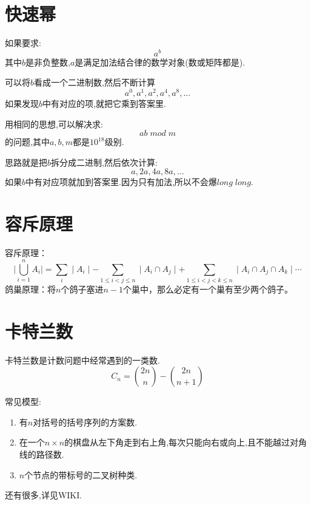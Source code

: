 \documentclass{beamer}
\begin{document}
	\section{快速幂}
		\begin{frame}
			如果要求:
			$$
				a^b 
			$$
			其中$b$是非负整数,$a$是满足加法结合律的数学对象(数或矩阵都是).
			
			\pause 
			
			可以将$b$看成一个二进制数,然后不断计算
			$$
				a^0, a^1, a^2,a^4,a^8,...
			$$
			如果发现$b$中有对应的项,就把它乘到答案里.
		\end{frame}
		\begin{frame}
			用相同的思想,可以解决求:
			$$
				ab \; mod \; m
			$$
			的问题,其中$a, b, m$都是$10^{18}$级别.
			
			\pause
			
			思路就是把$b$拆分成二进制,然后依次计算:
			$$
			a,2a,4a,8a,...
			$$
			如果$b$中有对应项就加到答案里.因为只有加法,所以不会爆$long\;long$.
		\end{frame}
	\section{容斥原理}
		\begin{frame}
			容斥原理：
			$$
			\mid \bigcup_{i = 1}^{n} A_i\mid = \sum_{i} \mid  A_i \mid - \sum_{1 \leq i < j \leq n} \mid A_i \cap A_j \mid + \sum_{1 \leq i < j < k \leq n} \mid A_i \cap A_j \cap A_k \mid \cdots 
			$$
			鸽巢原理：将$n$个鸽子塞进$n-1$个巢中，那么必定有一个巢有至少两个鸽子。
		\end{frame}
	\section{卡特兰数}
		\begin{frame}
			卡特兰数是计数问题中经常遇到的一类数.
			$$
				C_n = \binom{2n}{n} - \binom{2n}{n+1}
			$$
			
			\pause
			
			常见模型:
			\begin{enumerate}
				\item 有$n$对括号的括号序列的方案数.
				\item 在一个$n \times n$的棋盘从左下角走到右上角,每次只能向右或向上,且不能越过对角线的路径数.
				\item $n$个节点的带标号的二叉树种类.
			\end{enumerate}
			还有很多,详见WIKI.
		\end{frame}
\end{document}

